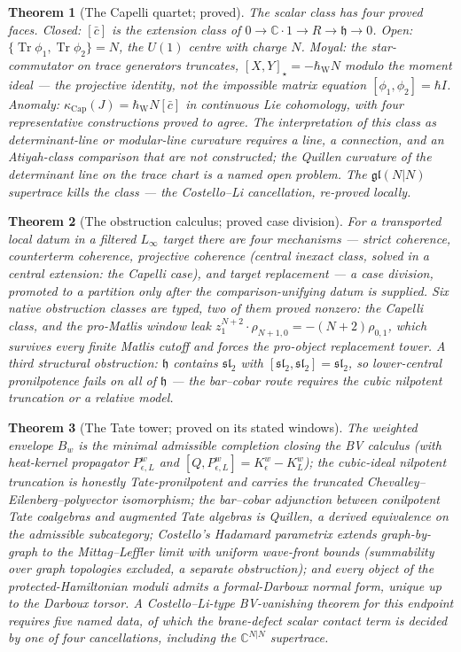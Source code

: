 \documentclass[11pt]{article}
\providecommand{\bC}{\mathbb{C}}
\providecommand{\fh}{\mathfrak{h}}
\providecommand{\fgl}{\mathfrak{gl}}
\providecommand{\fsl}{\mathfrak{sl}}
\providecommand{\Tr}{\operatorname{Tr}}
\providecommand{\hbW}{\hbar_{\mathrm{W}}}
\newtheorem{theorem}{Theorem}[section]
\begin{document}
\begin{theorem}[The Capelli quartet; proved]\label{thm:capelli}
The scalar class has four proved faces. Closed: $[\bar c]$ is the
extension class of $0\to\bC\cdot1\to R\to\fh\to0$. Open:
$\{\Tr\phi_1,\Tr\phi_2\}=N$, the $U(1)$ centre with charge $N$.
Moyal: the star-commutator on trace generators truncates,
$[X,Y]_\star=-\hbW N$ modulo the moment ideal --- the projective
identity, not the impossible matrix equation $[\phi_1,\phi_2]=\hbar I$.
Anomaly: $\kappa_{\mathrm{Cap}}(J)=\hbW N[\bar c]$ in continuous Lie
cohomology, with four representative constructions proved to agree.
The interpretation of this class as determinant-line or modular-line
curvature requires a line, a connection, and an Atiyah-class
comparison that are not constructed; the Quillen curvature of the
determinant line on the trace chart is a named open problem. The
$\fgl(N|N)$ supertrace kills the class --- the Costello--Li
cancellation, re-proved locally.
\end{theorem}

\begin{theorem}[The obstruction calculus; proved case division]
\label{thm:obstruction}
For a transported local datum in a filtered $L_\infty$ target there
are four mechanisms --- strict coherence, counterterm coherence,
projective coherence \textup{(central inexact class, solved in a
central extension: the Capelli case)}, and target replacement --- a
case division, promoted to a partition only after the
comparison-unifying datum is supplied. Six native obstruction classes
are typed, two of them proved nonzero: the Capelli class, and the
pro-Matlis window leak $z_1^{N+2}\cdot\rho_{N+1,0}=-(N+2)\rho_{0,1}$,
which survives every finite Matlis cutoff and forces the pro-object
replacement tower. A third structural obstruction: $\fh$ contains
$\fsl_2$ with $[\fsl_2,\fsl_2]=\fsl_2$, so lower-central pronilpotence
fails on all of $\fh$ --- the bar--cobar route requires the cubic
nilpotent truncation or a relative model.
\end{theorem}

\begin{theorem}[The Tate tower; proved on its stated windows]
\label{thm:tate}
The weighted envelope $B_w$ is the minimal admissible completion
closing the BV calculus \textup{(with heat-kernel propagator
$P^w_{\epsilon,L}$ and $[Q,P^w_{\epsilon,L}]=K^w_\epsilon-K^w_L$)};
the cubic-ideal nilpotent truncation is honestly Tate-pronilpotent and
carries the truncated Chevalley--Eilenberg--polyvector isomorphism;
the bar--cobar adjunction between conilpotent Tate coalgebras and
augmented Tate algebras is Quillen, a derived equivalence on the
admissible subcategory; Costello's Hadamard parametrix extends
graph-by-graph to the Mittag--Leffler limit with uniform wave-front
bounds \textup{(summability over graph topologies excluded, a separate
obstruction)}; and every object of the protected-Hamiltonian moduli
admits a formal-Darboux normal form, unique up to the Darboux torsor.
A Costello--Li-type BV-vanishing theorem for this endpoint requires
five named data, of which the brane-defect scalar contact term is
decided by one of four cancellations, including the $\bC^{N|N}$
supertrace.
\end{theorem}
\end{document}
